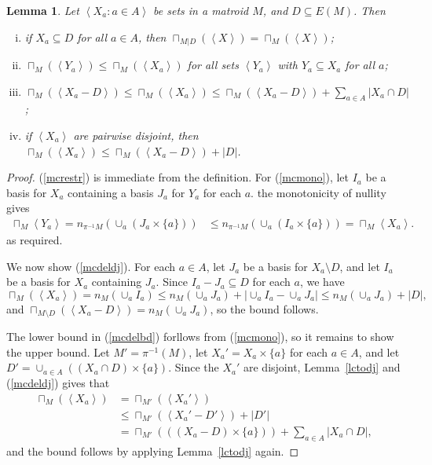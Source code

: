 \documentclass{amsart}
\theoremstyle{plain}
\newtheorem{lemma}[theorem]{Lemma}
\theoremstyle{definition}
\newcommand{\del}{\!\setminus\!}
\newcommand{\abs}[1]{\left| #1 \right|}
\newcommand{\br}[1]{\left(#1\right)}
\newcommand{\ab}[1]{\left\langle#1\right\rangle}
\renewcommand{\le}{\leqslant}
\renewcommand{\ss}{\subseteq}
\begin{document}
\begin{lemma}\label{mcdel}
  Let $\ab{X_a : a \in A}$ be sets in a matroid $M$, and $D \ss E(M)$. Then 
  \begin{enumerate}[(i)]
    \item\label{mcrestr} if $X_a \ss D$ for all $a \in A$, then $\sqcap_{M | D}(\ab{X}) = \sqcap_M(\ab{X})$;
    \item\label{mcmono}
      $\sqcap_M(\ab{Y_a}) \le \sqcap_M(\ab{X_a})$ for all sets $\ab{Y_a}$ with $Y_a \ss X_a$ for all $a$;
    \item\label{mcdelbd} $\sqcap_{M}(\ab{X_a - D}) \le \sqcap_M(\ab{X_a}) \le \sqcap_{M}(\ab{X_a-D}) + \sum_{a \in A}|X_a \cap D|$;
    \item\label{mcdeldj} if $\ab{X_a}$ are pairwise disjoint, 
    then $\sqcap_{M}(\ab{X_a}) \le \sqcap_{M}(\ab{X_a - D}) + |D|$. 
  \end{enumerate}
\end{lemma}
\begin{proof}
  (\ref{mcrestr}) is immediate from the definition. 
  For (\ref{mcmono}), let $I_a$ be a basis for $X_a$ containing a basis $J_a$ for $Y_a$
  for each $a$. the monotonicity of nullity gives
  \begin{align*}
    \sqcap_M{\ab{Y_a}} = n_{\pi^{-1}M}(\cup_a (J_a \times \{a\})) 
    &\le n_{\pi^{-1}M}(\cup_a (I_a \times \{a\})) = \sqcap_M{\ab{X_a}}.
  \end{align*}
  as required. 
  
  We now show (\ref{mcdeldj}). For each $a \in A$, let $J_a$ be a basis for $X_a \del D$, 
  and let $I_a$ be a basis for $X_a$ containing $J_a$. Since $I_a - J_a \ss D$ for each $a$, we have 
  \[\sqcap_M(\ab{X_a}) = n_M(\cup_a I_a) \le n_M(\cup_a J_a) + \abs{\cup_a I_a - \cup_a J_a} \le n_M(\cup_a J_a) + |D|,\]
  and $\sqcap_{M \del D}(\ab{X_a - D}) = n_M(\cup_a J_a)$, so the bound follows. 
  
  The lower bound in (\ref{mcdelbd}) forllows from (\ref{mcmono}), 
  so it remains to show the upper bound. Let $M' = \pi^{-1}(M)$, 
  let $X_a' = X_a \times \{a\}$ for each $a \in A$, 
  and let $D' = \cup_{a \in A}((X_a \cap D) \times \{a\})$. 
  Since the $X_a'$ are disjoint, 
  Lemma~\ref{lctodj} and (\ref{mcdeldj}) gives that 
  \begin{align*}
      \sqcap_M(\ab{X_a}) &= \sqcap_{M'}(\ab{X_a'}) 
      \\ &\le \sqcap_{M'}(\ab{X_a' - D'}) + |D'| \\
      &= \sqcap_{M'}(\br{(X_a - D) \times \{a\}}) + \sum_{a \in A}|X_a \cap D|,
  \end{align*}
  and the bound follows by applying Lemma~\ref{lctodj} again. 
\end{proof}
\end{document}

